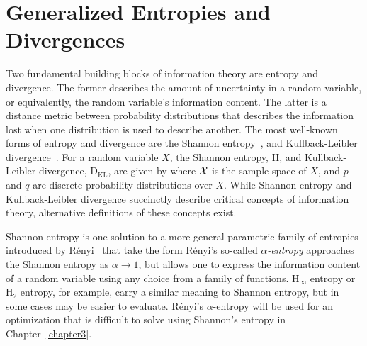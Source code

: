 \section{Generalized Entropies and Divergences}
\label{sec:entropy_and_divergence}

Two fundamental building blocks of information theory are entropy and
divergence. The former describes the amount of uncertainty in a random variable,
or equivalently, the random variable's information content. The latter is a
distance metric between probability distributions that describes the
information lost when one distribution is used to describe another.
The most well-known forms of entropy and divergence are the Shannon
entropy~\cite{shannon1948mathematical}, and
Kullback-Leibler divergence~\cite{kullback1951information}. For a random variable
$X$, the Shannon entropy, $\text{H}$, and Kullback-Leibler divergence,
$\text{D}_{\text{KL}}$, are given by
%
%
where $\mathcal{X}$ is the sample space of $X$, and $p$ and $q$ are discrete probability
distributions over $X$. While Shannon entropy and Kullback-Leibler divergence
succinctly describe critical concepts of information theory, alternative definitions of
these concepts exist.

Shannon entropy is one solution to a more general parametric family of
entropies introduced by R\'{e}nyi~\cite{renyi1961measures} that take the
form
%
%
R\'{e}nyi's so-called \textit{$\alpha$-entropy} approaches the Shannon entropy as $\alpha
\rightarrow 1$, but allows one to express the information content of a
random variable using any choice from a family of functions. $\text{H}_{\infty}$
entropy or $\text{H}_{2}$ entropy, for example, carry a similar meaning to
Shannon entropy, but in some cases may be easier to evaluate.
R\'{e}nyi's $\alpha$-entropy will be
used for an optimization that is difficult to solve using Shannon's entropy in
Chapter~\ref{chapter3}.

